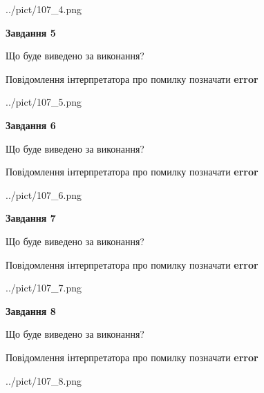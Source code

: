 \documentclass[12pt, ukrainian]{article}
\begin{document}
{\begin{center}
	{../pict/107_4.png}
\end{center}
\newpage

{\begin {center}\textbf{Завдання 5}\end {center}}\par
Що буде виведено за виконання? \par
Повідомлення інтерпретатора про помилку позначати \textbf{error}

\begin{center}
	{../pict/107_5.png}
\end{center}
\newpage

{\begin {center}\textbf{Завдання 6}\end {center}}\par
Що буде виведено за виконання? \par
Повідомлення інтерпретатора про помилку позначати \textbf{error}

\begin{center}
	{../pict/107_6.png}
\end{center}
\newpage

{\begin {center}\textbf{Завдання 7}\end {center}}\par
Що буде виведено за виконання? \par
Повідомлення інтерпретатора про помилку позначати \textbf{error}

\begin{center}
	{../pict/107_7.png}
\end{center}
\newpage

{\begin {center}\textbf{Завдання 8}\end {center}}\par
Що буде виведено за виконання? \par
Повідомлення інтерпретатора про помилку позначати \textbf{error}

\begin{center}
	{../pict/107_8.png}
\end{center}
\newpage

}
\end{document}
